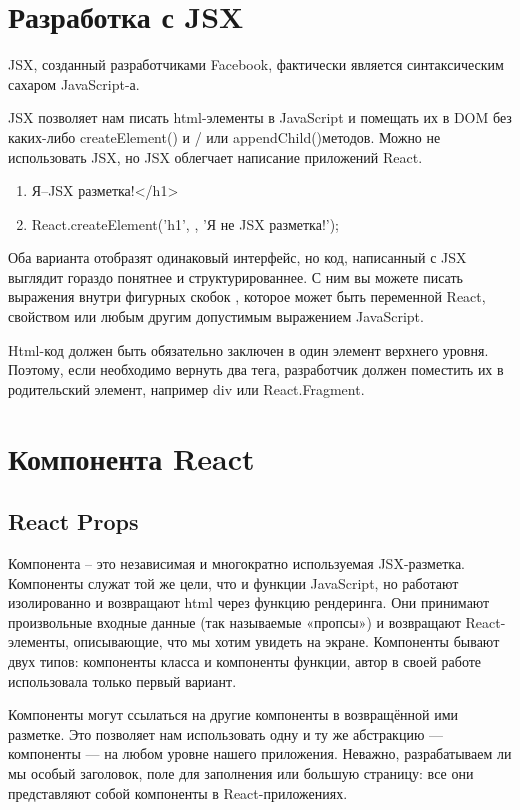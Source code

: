 \documentclass[14pt, a4paper]{diplom}
\begin{document}
\section{Разработка с JSX}

JSX, созданный разработчиками Facebook, фактически является синтаксическим сахаром JavaScript-а.

JSX позволяет нам писать html-элементы в JavaScript и помещать их в DOM без каких-либо createElement() и / или appendChild()методов. Можно не использовать JSX, но JSX облегчает написание приложений React.
\begin{enumerate}
\item<h1>Я--JSX разметка!</h1>
\item React.createElement('h1', {}, 'Я не JSX разметка!');
\end{enumerate}

Оба варианта отобразят одинаковый интерфейс, но код, написанный с JSX выглядит гораздо понятнее и структурированнее. С ним вы можете писать выражения внутри фигурных скобок {}, которое
может быть переменной React, свойством или любым другим допустимым выражением JavaScript.

Html-код должен быть обязательно заключен в один элемент верхнего уровня.
Поэтому, если необходимо вернуть два тега, разработчик должен поместить их в родительский элемент, например div или React.Fragment.
\section{Компонента React}

\subsection{React Props}

Компонента -- это независимая и многократно используемая JSX-разметка. Компоненты служат той же цели, что и функции JavaScript, но работают изолированно и возвращают html через функцию рендеринга. Они принимают произвольные входные данные (так называемые «пропсы») и возвращают React-элементы, описывающие, что мы хотим увидеть на экране.
Компоненты бывают двух типов: компоненты класса и компоненты функции, автор в своей работе использовала только первый вариант.

Компоненты могут ссылаться на другие компоненты в возвращённой ими разметке. Это позволяет нам использовать одну и ту же абстракцию — компоненты — на любом уровне нашего приложения. Неважно, разрабатываем ли мы особый заголовок, поле для заполнения или большую страницу: все они представляют собой компоненты в React-приложениях.
\end{document}
